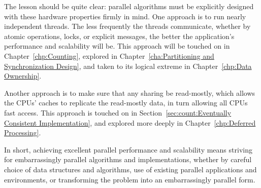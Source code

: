The lesson should be quite clear:
parallel algorithms must be explicitly designed with these hardware
properties firmly in mind.
One approach is to run nearly independent threads.
The less frequently the threads communicate, whether by atomic operations,
locks, or explicit messages, the better the application's performance
and scalability will be.
This approach will be touched on in
Chapter~\ref{chp:Counting},
explored in
Chapter~\ref{cha:Partitioning and Synchronization Design},
and taken to its logical extreme in
Chapter~\ref{chp:Data Ownership}.

Another approach is to make sure that any sharing be read-mostly, which
allows the CPUs' caches to replicate the read-mostly data, in turn
allowing all CPUs fast access.
This approach is touched on in
Section~\ref{sec:count:Eventually Consistent Implementation},
and explored more deeply in
Chapter~\ref{chp:Deferred Processing}.

In short, achieving excellent parallel performance and scalability means
striving for embarrassingly parallel algorithms and implementations,
whether by careful choice of data structures and algorithms, use of
existing parallel applications and environments, or transforming the
problem into an embarrassingly parallel form.

\QuickQuizEnd
